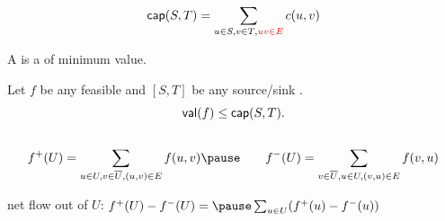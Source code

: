\begin{frame}{}

  \begin{definition}
    \[
      \textsf{cap}(S, T) = \sum_{u \in S, v \in T, \textcolor{red}{uv \in E}} c(u, v)
    \]
  \end{definition}
\end{frame}

\begin{frame}{}

  \pause
  \begin{definition}
    A  is a  of minimum value.
  \end{definition}

  \pause
  \vspace{0.50cm}
\end{frame}

\begin{frame}{}
  \begin{theorem}
    Let $f$ be any feasible  and $[S, T]$ be any source/sink .
    \[
      \textsf{val}(f) \le \textsf{cap}(S, T).
    \]
  \end{theorem}

\end{frame}

\begin{frame}{}
  \begin{columns}
  \end{columns}

  \vspace{0.50cm}
  \[
    f^{+}(U) = \sum_{u \in U, v \in \overline{U}, (u, v) \in E} f(u, v) \pause\qquad
    f^{-}(U) = \sum_{v \in \overline{U}, u \in U, (v, u) \in E} f(v, u)
  \]

  \pause
  \vspace{0.50cm}
  \begin{center}
    net flow out of $U$: $f^{+}(U) - f^{-}(U) = \pause
      \sum_{u \in U} (f^{+}(u) - f^{-}(u))$
  \end{center}
\end{frame}

